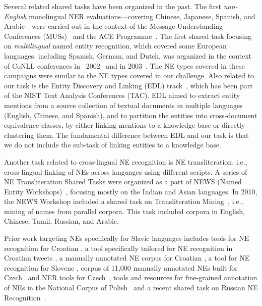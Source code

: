 \documentclass[11pt]{article}
\begin{document}
Several related shared tasks have been organized in the past.  The first
{\em non-English} monolingual NER evaluations---covering Chinese,
Japanese, Spanish, and Arabic---were carried out in the context of the
Message Understanding Conferences (MUSs)~\cite{chinchor:98} and the ACE
Programme~\cite{conf/lrec/DoddingtonMPRSW04}.  The first shared task
focusing on \emph{multilingual} named entity recognition, which covered
some European languages, including Spanish, German, and Dutch, was
organized in the context of CoNLL conferences in
~2002~\cite{TjongKimSang:2002:ICS:1118853.1118877} and in
2003~\cite{TjongKimSang:2003:ICS:1119176.1119195}.  The NE types covered
in these campaigns were similar to the NE types covered in our challenge.
Also related to our task is the Entity Discovery and Linking (EDL)
track~\cite{ji:ea:2014,ji:ea:2015}, which has been part of the NIST Text
Analysis Conferences (TAC).  EDL aimed to extract entity mentions from a
source collection of textual documents in multiple languages (English,
Chinese, and Spanish), and to partition the entities into cross-document
equivalence classes, by either linking mentions to a knowledge base or
directly clustering them.  The fundamental difference between EDL and our
task is that we do not include the sub-task of linking entities to a
knowledge base.

Another task related to cross-lingual NE recognition is NE
transliteration, i.e., cross-lingual linking of NEs across languages
using different scripts.  A series of NE Transliteration Shared Tasks
were organized as a part of NEWS (Named Entity
Workshops)~\cite{duan2016report}, focusing mostly on the Indian and Asian
languages.  In 2010, the NEWS Workshop included a shared task on
Transliteration Mining~\cite{kumaran2010report}, i.e., mining of names
from parallel corpora.  This task included corpora in English, Chinese,
Tamil, Russian, and Arabic.

Prior work targeting NEs specifically for Slavic languages includes tools for NE recognition for
Croatian \cite{karan2013croner,ljubesic2013combining}, a tool specifically tailored for NE
recognition in Croatian tweets \cite{baksa2017tagging}, a manually annotated NE
corpus for Croatian \cite{agic2014setimes}, a tool for NE recognition for
Slovene \cite{ljubesic2013combining}, corpus of 11,000 manually annotated NEs
built for Czech~\cite{vsevvcikova2007named} and NER tools for Czech~\cite{Konkol:2013}, 
tools and resources for fine-grained annotation of NEs in the National Corpus of
Polish~\cite{was:etal:10,sav:pis:11} and a recent shared task on Russian NE
Recognition~\cite{alexeeva2016factrueval}.
\end{document}
